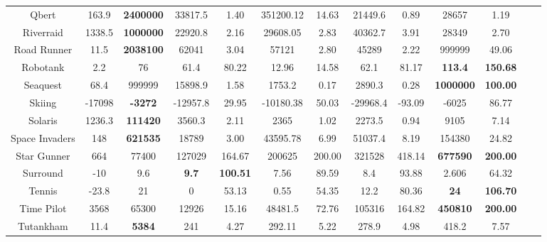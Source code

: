 \documentclass[nohyperref]{article}
\theoremstyle{plain}
\begin{document}
\begin{table}[!hb]
\begin{center}
\begin{tabular}{ |c |c |c| c c| c c|  c c |c c |c c |}
 Qbert              & 163.9     & \textbf{2400000}   & 33817.5  &1.40    & 351200.12  & 14.63      & 21449.6 & 0.89               &28657           &1.19  \\
 Riverraid          & 1338.5    & \textbf{1000000}   & 22920.8  &2.16    & 29608.05   & 2.83       & 40362.7 & 3.91                &28349           &2.70  \\
 Road Runner        & 11.5      & \textbf{2038100}   & 62041    &3.04    & 57121      & 2.80       & 45289   & 2.22                     &999999          &49.06\\
 Robotank           & 2.2       & 76                 & 61.4     &80.22   & 12.96      & 14.58      & 62.1    & 81.17      &\textbf{113.4}  &\textbf{150.68}  \\
 Seaquest           & 68.4      & 999999             & 15898.9  &1.58    & 1753.2     & 0.17       & 2890.3  & 0.28     &\textbf{1000000}          &\textbf{100.00}  \\
 Skiing             & -17098    & \textbf{-3272}     & -12957.8 &29.95   & -10180.38  & 50.03      & -29968.4& -93.09             &-6025	         &86.77   \\
 Solaris            & 1236.3    & \textbf{111420}    & 3560.3   &2.11    & 2365       & 1.02       & 2273.5  & 0.94               &9105            &7.14  \\
 Space Invaders     & 148       & \textbf{621535 }   & 18789    &3.00    & 43595.78   & 6.99       & 51037.4 & 8.19                      &154380          &24.82\\
 Star Gunner        & 664       & 77400              & 127029   &164.67  & 200625     & 200.00     & 321528  & 418.14      &\textbf{677590} &\textbf{200.00}  \\
 Surround           & -10       & 9.6                & \textbf{9.7}      &\textbf{100.51}  & 7.56       & 89.59      & 8.4     & 93.88       &2.606           &64.32\\
 Tennis             & -23.8     & 21                 & 0        &53.13   & 0.55       & 54.35      & 12.2    & 80.36      &\textbf{24} &\textbf{106.70}  \\
 Time Pilot         & 3568      & 65300              & 12926    &15.16   & 48481.5    & 72.76      & 105316  & 164.82      &\textbf{450810}          &\textbf{200.00}\\
 Tutankham          & 11.4      & \textbf{5384}      & 241      &4.27    & 292.11     & 5.22       & 278.9   & 4.98                         &418.2           &7.57\\

\end{tabular}
\end{center}
\end{table}
\end{document}

